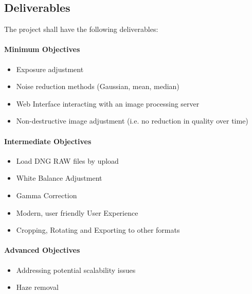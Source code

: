 \documentclass[12pt,a4paper]{article}
\begin{document}
\subsection{Deliverables}
The project shall have the following deliverables:

\paragraph{Minimum Objectives}
    \begin{itemize}
      \item Exposure adjustment
      \item Noise reduction methods (Gaussian, mean, median)
      \item Web Interface interacting with an image processing server
      \item Non-destructive image adjustment (i.e. no reduction in quality over time)
    \end{itemize}
\paragraph{Intermediate Objectives}
    \begin{itemize}
      \item Load DNG RAW files by upload
      \item White Balance Adjustment
      \item Gamma Correction
      \item Modern, user friendly User Experience
      \item Cropping, Rotating and Exporting to other formats
    \end{itemize}
\paragraph{Advanced Objectives}
    \begin{itemize}
      \item Addressing potential scalability issues
      \item Haze removal
    \end{itemize}
\end{document}
